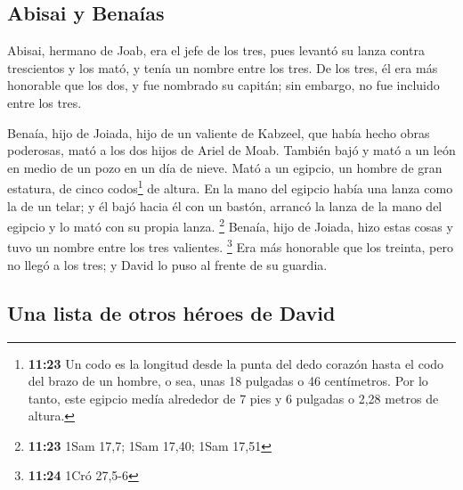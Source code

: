 \hypertarget{abisai-y-benauxedas}{%
\subsection{Abisai y Benaías}\label{abisai-y-benauxedas}}

 Abisai, hermano de Joab, era el jefe de los tres, pues
levantó su lanza contra trescientos y los mató, y tenía un nombre entre
los tres.  De los tres, él era más honorable que los dos,
y fue nombrado su capitán; sin embargo, no fue incluido entre los tres.

 Benaía, hijo de Joiada, hijo de un valiente de Kabzeel,
que había hecho obras poderosas, mató a los dos hijos de Ariel de Moab.
También bajó y mató a un león en medio de un pozo en un día de nieve.
 Mató a un egipcio, un hombre de gran estatura, de cinco
codos\footnote{\textbf{11:23} Un codo es la longitud desde la punta del
  dedo corazón hasta el codo del brazo de un hombre, o sea, unas 18
  pulgadas o 46 centímetros. Por lo tanto, este egipcio medía alrededor
  de 7 pies y 6 pulgadas o 2,28 metros de altura.} de altura. En la mano
del egipcio había una lanza como la de un telar; y él bajó hacia él con
un bastón, arrancó la lanza de la mano del egipcio y lo mató con su
propia lanza. \footnote{\textbf{11:23} 1Sam 17,7; 1Sam 17,40; 1Sam 17,51}
 Benaía, hijo de Joiada, hizo estas cosas y tuvo un
nombre entre los tres valientes. \footnote{\textbf{11:24} 1Cró 27,5-6}
 Era más honorable que los treinta, pero no llegó a los
tres; y David lo puso al frente de su guardia.

\hypertarget{una-lista-de-otros-huxe9roes-de-david}{%
\subsection{Una lista de otros héroes de
David}\label{una-lista-de-otros-huxe9roes-de-david}}

